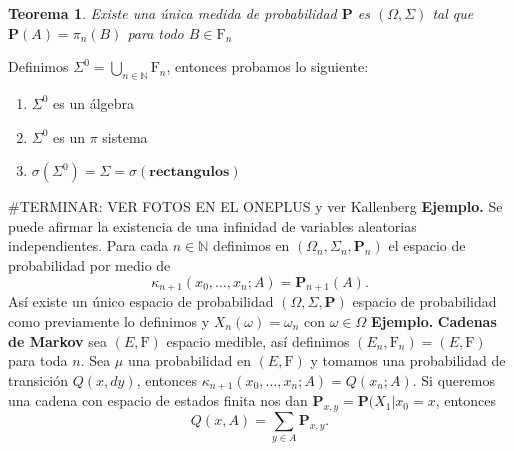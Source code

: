 \documentclass[letterpaper]{article}
\newtheorem{teorema}{Teorema}[section]
\newcommand{\nat}{\ensuremath{ \mathbb N }}
\newcommand{\prob}{\textbf{P}}
\newcommand{\eje}{{\newline \noindent \sc \textbf{Ejemplo. }}}
\newcommand{\dem}{{\noindent \sc Demostraci\'on. }}
\newcommand{\om}{\ensuremath{\Omega}}
\newcommand{\sig}{\ensuremath{\Sigma}}
\begin{document}
\begin{teorema}
Existe una única medida de probabilidad $\prob$ es $(\om,\sig)$ tal que $\prob(A)=\pi_n(B)$ para todo $B\in\mathrm{F}_n$
\end{teorema}
\noindent\dem Definimos \(\sig^{0}=\bigcup_{n\in\nat}\mathrm{F}_n\), entonces probamos lo siguiente:
\begin{enumerate}
\item \(\sig^{0}\) es un álgebra
\item \(\sig^{0}\) es un \(\pi\) sistema
\item \(\sigma(\sig^{0})=\sig=\sigma(\textbf{rectangulos})\)
\end{enumerate}
\#TERMINAR: VER FOTOS EN EL ONEPLUS y ver Kallenberg
\eje Se puede afirmar la existencia de una infinidad de variables aleatorias independientes. Para cada \(n\in\nat\) definimos en \((\om_n,\sig_n,\prob_n)\) el espacio de probabilidad por medio de
\[
    \kappa_{n+1}(x_0,\dots,x_n;A)=\prob_{n+1}(A).
\]
\noindent Así existe un único espacio de probabilidad \((\om,\sig,\prob)\) espacio de probabilidad como previamente lo definimos y \(X_n(\omega)=\omega_n\) con \(\omega\in\om\)
\eje \textbf{Cadenas de Markov} sea \((E,\mathrm{F})\) espacio medible, así definimos \((E_n,\mathrm{F}_n)=(E,\mathrm{F})\) para toda \(n\). Sea \(\mu\) una probabilidad en \((E,\mathrm{F})\) y tomamos una probabilidad de transición \(Q(x,dy)\), entonces \(\kappa_{n+1}(x_0,\dots,x_n;A)=Q(x_n;A)\). Si queremos una cadena con espacio de estados finita nos dan \(\prob_{x,y}=\prob(X_1|x_0=x\), entonces
\[
       Q(x,A)=\sum_{y\in A}\prob_{x,y}.
\]
\end{document}
